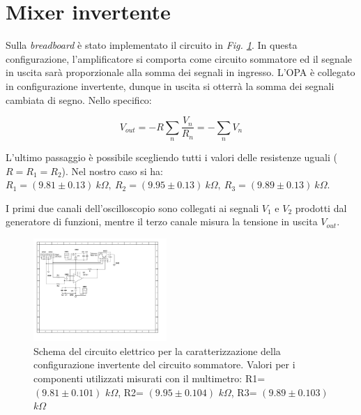 \documentclass[journal]{IEEEtran}
\begin{document}

\section{\textbf{Mixer invertente}} %
Sulla \textit{breadboard} è stato implementato il circuito in \textit{Fig. \ref{fig:OPA-mixer}}. In questa configurazione, l'amplificatore si comporta come circuito sommatore ed il segnale in uscita sarà proporzionale alla somma dei segnali in ingresso. L'OPA è collegato in configurazione invertente, dunque in uscita si otterrà la somma dei segnali cambiata di segno. Nello specifico: 

\begin{equation}
V_{out} = - R  \sum_{n} \frac{V_n}{R_n} = - \sum_{n} V_n 
\end{equation}

 L'ultimo passaggio è possibile scegliendo tutti i valori delle resistenze uguali ($R = R_1 = R_2$). Nel nostro caso si ha: $R_1 =(9.81 \pm 0.13) \ k\Omega, \ R_2 = (9.95 \pm 0.13) \ k\Omega ,\ R_3 = (9.89 \pm 0.13) \ k\Omega$.

I primi due canali dell'oscilloscopio sono collegati ai segnali $V_1$ e $V_2$ prodotti dal generatore di funzioni, mentre il terzo canale misura la tensione in uscita $V_{out}$.


\begin{figure}[H]%
\begin{center}
\includegraphics[width=0.45\textwidth]{sch-simulations/output/OPA-mixer.pdf}
\caption{Schema  del  circuito  elettrico  per  la  caratterizzazione  della configurazione invertente del circuito sommatore. Valori per i componenti utilizzati misurati con il multimetro: R1= $(9.81 \pm 0.101)$ $k\Omega$, R2= $(9.95 \pm 0.104)$ $k\Omega$, R3= $(9.89 \pm 0.103)$ $k\Omega$}
\label{fig:OPA-mixer}
\end {center}
\end{figure}
\end{document}
